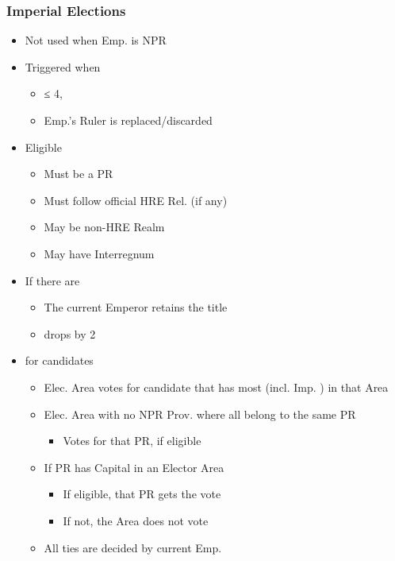 \documentclass[10pt]{article}
\begin{document}
\subsubsection*{Imperial Elections }
\begin{itemize}
	\item Not used when Emp. is NPR 
	\item Triggered when
	\begin{itemize}
		\item \authority ≤ 4, 
		\item Emp.'s Ruler is replaced/discarded
	\end{itemize}
	\item Eligible 
	\begin{itemize}
		\item Must be a PR
		\item Must follow official HRE Rel. (if any)
		\item May be non-HRE Realm
		\item May have Interregnum
	\end{itemize}
	\item If there are 
	\begin{itemize}
		\item The current Emperor retains the title
		\item \authority drops by 2
	\end{itemize}
	\item {} for candidates
	\begin{itemize}
		\item Elec. Area votes for candidate that has most \influence (incl. Imp. \influence) in that Area
		\item Elec. Area with no NPR Prov. where all \vassals belong to the same PR
		\begin{itemize}
			\item Votes for that PR, if eligible
		\end{itemize}
		\item If PR has Capital in an Elector Area
		\begin{itemize}
			\item If eligible, that PR gets the vote
			\item If not, the Area does not vote
		\end{itemize}
		\item All ties are decided by current Emp.

\end{itemize}
\end{itemize}
\end{document}
